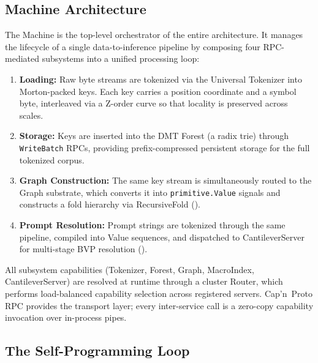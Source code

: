 \subsection{Machine Architecture}
\label{sec:vm_machine}

The Machine is the top-level orchestrator of the entire architecture.  It
manages the lifecycle of a single data-to-inference pipeline by composing
four RPC-mediated subsystems into a unified processing loop:

\begin{enumerate}[nosep]
  \item \textbf{Loading:} Raw byte streams are tokenized via the Universal
        Tokenizer into Morton-packed keys.  Each key carries a position
        coordinate and a symbol byte, interleaved via a Z-order curve so that
        locality is preserved across scales.
  \item \textbf{Storage:} Keys are inserted into the DMT Forest (a radix
        trie) through \texttt{WriteBatch} RPCs, providing prefix-compressed
        persistent storage for the full tokenized corpus.
  \item \textbf{Graph Construction:} The same key stream is simultaneously
        routed to the Graph substrate, which converts it into
        \texttt{primitive.Value} signals and constructs a fold hierarchy via
        RecursiveFold ().
  \item \textbf{Prompt Resolution:} Prompt strings are tokenized through the
        same pipeline, compiled into Value sequences, and dispatched to
        CantileverServer for multi-stage BVP resolution
        ().
\end{enumerate}

All subsystem capabilities (Tokenizer, Forest, Graph, MacroIndex,
CantileverServer) are resolved at runtime through a cluster Router, which
performs load-balanced capability selection across registered servers.
Cap'n~Proto RPC provides the transport layer; every inter-service call is a
zero-copy capability invocation over in-process pipes.

\subsection{The Self-Programming Loop}
\label{sec:self_programming}

